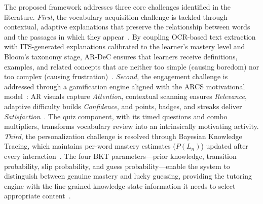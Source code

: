 The proposed framework addresses three core challenges identified in the literature. \emph{First}, the vocabulary acquisition challenge is tackled through contextual, adaptive explanations that preserve the relationship between words and the passages in which they appear~\cite{Hulstijn2001,Nation2013}. By coupling OCR-based text extraction with ITS-generated explanations calibrated to the learner's mastery level and Bloom's taxonomy stage, AR-DeC ensures that learners receive definitions, examples, and related concepts that are neither too simple (causing boredom) nor too complex (causing frustration)~\cite{Laufer2010,Schmitt2008}. \emph{Second}, the engagement challenge is addressed through a gamification engine aligned with the ARCS motivational model~\cite{Keller2010}: AR visuals capture \emph{Attention}, contextual scanning ensures \emph{Relevance}, adaptive difficulty builds \emph{Confidence}, and points, badges, and streaks deliver \emph{Satisfaction}~\cite{Deterding2011,Hamari2014,Sailer2017}. The quiz component, with its timed questions and combo multipliers, transforms vocabulary review into an intrinsically motivating activity. \emph{Third}, the personalization challenge is resolved through Bayesian Knowledge Tracing, which maintains per-word mastery estimates ($P(L_n)$) updated after every interaction~\cite{Corbett1994}. The four BKT parameters---prior knowledge, transition probability, slip probability, and guess probability---enable the system to distinguish between genuine mastery and lucky guessing, providing the tutoring engine with the fine-grained knowledge state information it needs to select appropriate content~\cite{VanLehn2011}.

